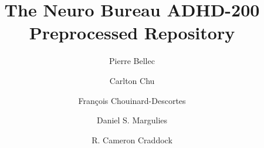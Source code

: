\documentclass[preprint,12pt,5p]{elsarticle}
\begin{document}
\begin{frontmatter}

\title{The Neuro Bureau ADHD-200 Preprocessed Repository}




\author[label0,label1,label2]{Pierre Bellec}
\address[label0]{The Neuro Bureau}
\address[label1]{Centre de Recherche de l'Institut Universitaire de G\'eriatrie de Montr\'eal, Montr\'eal, CA}
\address[label2]{D\'epartement d'Informatique et de Recherche Op\'erationnelle, Universit\'e de Montr\'eal, Montr\'eal, CA}



\author[label0,label3]{Carlton Chu}
\address[label3]{Deep Mind, London, UK}

\author[label0,label1,label4]{Fran\c{c}ois Chouinard-Descortes}
\address[label4]{McGill University, Montreal, CA}

\author[label0,label5]{Daniel S. Margulies}
\address[label5]{Max Planck Research Group for Neuroanatomy \& Connectivity, Max Planck Institute for Human Cognitive and Brain Sciences, Leipzig, Germany}

\author[label0,lab6,lab7]{R. Cameron Craddock}
\address[lab6]{Computational Neuroimaging Laboratory, Center for Biomedical Imaging and Neuromodulation, Nathan S. Kline Institute for Psychiatric Research, Orangeburg, NY, USA}
\address[lab7]{Center for the Developing Brain, Child Mind Institute, New York, NY, USA}


\end{frontmatter}
\end{document}
